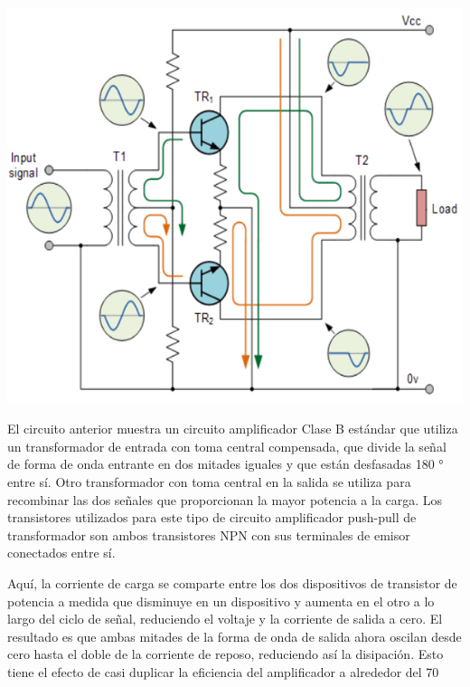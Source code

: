\documentclass[12pt,a4paper]{article}
\begin{document}
\includegraphics[weidth=10cm]{2.jpg} 
\begin{flushleft}
El circuito anterior muestra un circuito amplificador Clase B estándar que utiliza un transformador de entrada con toma central compensada, que divide la señal de forma de onda entrante en dos mitades iguales y que están desfasadas 180 ° entre sí. Otro transformador con toma central en la salida se utiliza para recombinar las dos señales que proporcionan la mayor potencia a la carga. Los transistores utilizados para este tipo de circuito amplificador push-pull de transformador son ambos transistores NPN con sus terminales de emisor conectados entre sí.

Aquí, la corriente de carga se comparte entre los dos dispositivos de transistor de potencia a medida que disminuye en un dispositivo y aumenta en el otro a lo largo del ciclo de señal, reduciendo el voltaje y la corriente de salida a cero. El resultado es que ambas mitades de la forma de onda de salida ahora oscilan desde cero hasta el doble de la corriente de reposo, reduciendo así la disipación. Esto tiene el efecto de casi duplicar la eficiencia del amplificador a alrededor del 70%

\end{flushleft}
\end{document}
